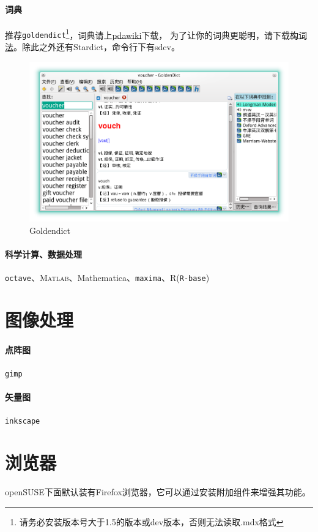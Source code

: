 \documentclass[11pt,openany]{book}
\newcommand{\soft}[1]{\texttt{\textcolor{dgreen}{#1}}}
\begin{document}
\paragraph{词典} 推荐\soft{goldendict}\footnote{请务必安装版本号大于1.5的版本或dev版本，否则无法读取.mdx格式}，词典请上\href{http://pdawiki.com/forum/forum.php}{pdawiki}下载，
为了让你的词典更聪明，请下载\href{https://zpj.blog.ustc.edu.cn/wp-content/uploads/2014/02/wordsrule.tar.gz}{构词法}。除此之外还有Stardict，命令行下有sdcv。

\begin{figure}[htbp!]
\centering
\includegraphics[width=\textwidth]{./pic/goldendict.png} 
\caption{Goldendict}\label{goldendict}
\end{figure}

\paragraph{科学计算、数据处理}\soft{octave}、\textsc{Matlab}、Mathematica、\soft{maxima}、R(\soft{R-base})
\section{图像处理}
\paragraph{点阵图}\soft{gimp}

\paragraph{矢量图}\soft{inkscape}
\section{浏览器}
openSUSE下面默认装有Firefox浏览器，它可以通过安装附加组件来增强其功能。
\end{document}
